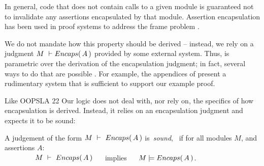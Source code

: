 {In general},  code that does not contain 
calls to a {given} module is guaranteed not to invalidate any assertions encapsulated by that module.
 Assertion encapsulation has been used in proof systems to {address}   the  {frame} problem
 \cite{objInvars,encaps}. 

We  do not mandate how this property should be derived -- instead, we rely on a judgment 
$M\ \vdash  \encaps{A}$ provided by some external system. 
Thus, \SpecLang is parametric over the derivation of the encapsulation
     judgment; in fact, several ways to do that are possible \cite{TAME2003,ownEncaps,objInvars}. For example,
 the appendices of
    \cite{necessityFull} present a 
    rudimentary system that is sufficient to support our example
    proof.  



Like OOPSLA 22 Our logic does not {deal with, nor} rely on, the specifics of  how   encapsulation
{is derived}.
{Instead, it relies} on an encapsulation judgment and expects it to be sound:

\begin{definition}
\label{lem:encap-soundness}
A judgement of the form $M\ \vdash\ {Encaps(\, A\, )}$  is\  \emph{sound}, \ if 
for all modules $M$, and assertions $A$:\\

$\strut \hspace{1.5cm} M\ \vdash\ {Encaps(\, A\, )} \ \ \ \ $ implies $\ \ \ \ \satisfies{M}{\encaps{A}}$.
\end{definition}




